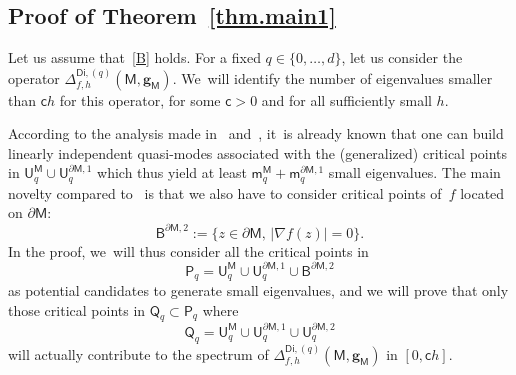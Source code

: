 \documentclass[JEP,XML,SOM,Unicode,NoEqCountersInSection,NoFloatCountersInSection,published]{cedram}
\newcommand{\mbf}[1]{\mathbf{#1}}
\let\pa\partial
\theoremstyle{plain}
\theoremstyle{definition}
\begin{document}
\subsection{Proof of Theorem~\ref{thm.main1}}\label{sec.numb-small}
Let us assume that~\ref{B} holds.
For a fixed $q\in \{0,\ldots,d\}$, let us consider the operator $\Delta_{f,h}^{\mathsf{Di},(q)}(\mathsf M,\mbf g_{\mathsf M})$. We~will identify the number of eigenvalues smaller than $\mathsf c h$ for
this operator, for some $\mathsf c>0$ and for all
sufficiently small $h$.

According to the analysis made in~\cite[Chap.\,3]{helffer-nier-06}
and~\cite{helffer-sjostrand-85}, it~is already known that one can build linearly
independent quasi-modes associated with
the (generalized) critical points in $\mathsf U_q^{\mathsf M}\cup \mathsf U^{\pa \mathsf M,1}_q$ which thus yield
at least $\mathsf m_q^{\mathsf M}+\mathsf m_q^{\pa \mathsf M,1}$
small eigenvalues. The main novelty compared
to~\cite[Chap.\,3]{helffer-nier-06} is that we also have to consider critical
points of~$f$ located on $\partial \mathsf M$:
\begin{equation}\label{eq.defB}
\mathsf B^{\pa \mathsf M,2}:=\big \{z \in \pa \mathsf M, \, \vert \nabla f(z)\vert =0 \}.
\end{equation}
In the proof, we~will thus consider all the critical points in
\[
\mathsf P_q= \mathsf U_q^{\mathsf M}\cup \mathsf U^{\pa \mathsf M,1}_q\cup \mathsf B^{\pa \mathsf M,2}
\]
as potential candidates to generate small eigenvalues, and we will prove
that only those critical points in $\mathsf Q_q \subset \mathsf P_q$ where
\[
\mathsf Q_q= \mathsf U_q^{\mathsf M}\cup \mathsf U^{\pa \mathsf M,1}_q\cup \mathsf U^{\pa \mathsf M,2}_q
\]
will actually contribute to the spectrum of
$\Delta_{f,h}^{\mathsf{Di},(q)}(\mathsf M,\mbf g_{\mathsf M})$ in
$[0,\mathsf ch]$.
\end{document}
